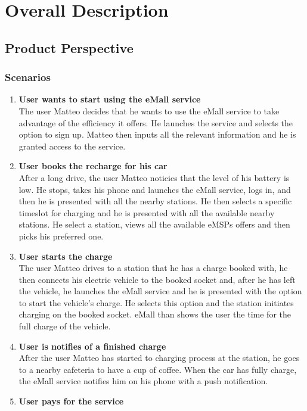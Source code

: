 \section{Overall Description}
\subsection{Product Perspective}
\subsubsection{Scenarios}
\begin{enumerate}
    \item \textbf{User wants to start using the eMall service}\\
    The user Matteo decides that he wants to use the eMall service to 
    take advantage of the efficiency it offers. 
    He launches the service and selects the option to sign up. 
    Matteo then inputs all the relevant information and he is granted access to the service.
    \item \textbf{User books the recharge for his car}\\
    After a long drive, the user Matteo noticies that the level of his battery is low. 
    He stops, takes his phone and launches the eMall service, logs in, and then he is presented with all the nearby stations.
    He then selects a specific timeslot for charging and he is presented with all the available nearby stations.
    He select a station, views all the available eMSPs offers and then picks his preferred one.  
    \item \textbf{User starts the charge}\\
    The user Matteo drives to a station that he has a charge booked with, he then connects his electric 
    vehicle to the booked socket and, after he has left the vehicle, he launches the eMall service and 
    he is presented with the option to start the vehicle's charge. He selects this option and the station initiates charging on the booked socket. eMall than shows the user the time for the full charge of the vehicle. 
    \item \textbf{User is notifies of a finished charge}\\
    After the user Matteo has started to charging process at the station,
     he goes to a nearby cafeteria to have a cup of coffee. When the car has fully charge, the eMall service notifies him on his phone with a push notification.
    \item \textbf{User pays for the service}\\

\end{enumerate}
